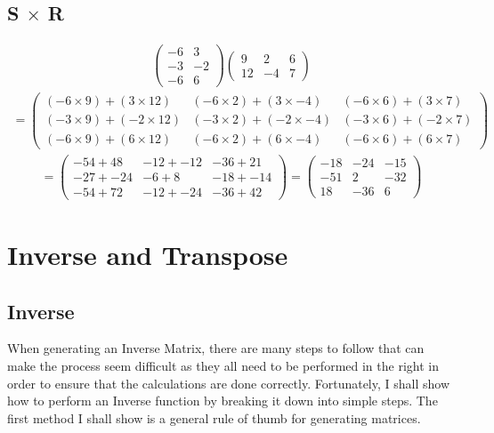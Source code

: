 \documentclass[a4paper,10pt]{article}
\begin{document}
      \subsection{S $\times$ R}
        \begin{align*}
          \begin{pmatrix}
            -6 & 3\\
            -3 & -2\\
            -6 & 6
          \end{pmatrix}
          \begin{pmatrix}
            9 & 2 & 6\\
            12 & -4 & 7
          \end{pmatrix}
        \end{align*}
        \begin{align*}
          =
          \begin{pmatrix}
            (-6 \times 9) + ( 3 \times 12) & (-6 \times 2) + ( 3 \times -4) & (-6 \times 6) + ( 3 \times 7)\\
            (-3 \times 9) + (-2 \times 12) & (-3 \times 2) + (-2 \times -4) & (-3 \times 6) + (-2 \times 7)\\
            (-6 \times 9) + ( 6 \times 12) & (-6 \times 2) + ( 6 \times -4) & (-6 \times 6) + ( 6 \times 7)
          \end{pmatrix}
        \end{align*}
        \begin{align*}
          =
          \begin{pmatrix}
            -54 +  48 & -12 + -12 & -36 +  21\\
            -27 + -24 & -6  +   8 & -18 + -14\\
            -54 +  72 & -12 + -24 & -36 +  42
          \end{pmatrix}
          =
          \begin{pmatrix}
            -18 & -24 & -15\\
            -51 &   2 & -32\\
             18 & -36 &   6
          \end{pmatrix}
        \end{align*}

    \newpage

    \section{Inverse and Transpose}
      \subsection{Inverse}
        When generating an Inverse Matrix, there are many steps to follow that can make the process seem difficult as they all need to be performed in the right in order to ensure that the calculations are done correctly. Fortunately, I shall show how to perform an Inverse function by breaking it down into simple steps. The first method I shall show is a general rule of thumb for generating matrices.
\end{document}

